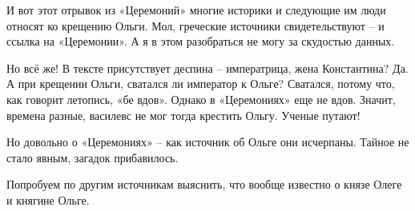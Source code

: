 И вот этот отрывок из «Церемоний» многие историки и следующие им люди относят ко крещению Ольги. Мол, греческие источники свидетельствуют – и ссылка на «Церемонии». А я в этом разобраться не могу за скудостью данных. 

Но всё же! В тексте присутствует деспина – императрица, жена Константина? Да. А при крещении Ольги, сватался ли император к Ольге? Сватался, потому что, как говорит летопись, «бе вдов». Однако в «Церемониях» еще не вдов. Значит, времена разные, василевс не мог тогда крестить Ольгу. Ученые путают!

Но довольно о «Церемониях» – как источник об Ольге они исчерпаны. Тайное не стало явным, загадок прибавилось.

Попробуем по другим источникам выяснить, что вообще известно о князе Олеге и княгине Ольге.
